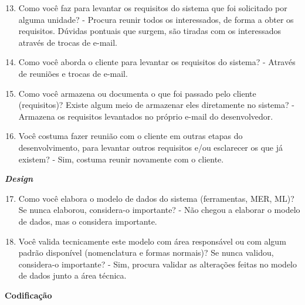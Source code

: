\begin{apendicesenv}
\begin{enumerate}
	\setcounter{enumi}{12}
	\item Como você faz para levantar os requisitos do sistema que foi solicitado por alguma
	unidade?\newline
	- Procura reunir todos os interessados, de forma a obter os requisitos. Dúvidas pontuais que surgem, são tiradas com os interessados através de trocas de e-mail.
	\item Como você aborda o cliente para levantar os requisitos do sistema?\newline
	- Através de reuniões e trocas de e-mail.
	\item Como você armazena ou documenta o que foi passado pelo cliente (requisitos)? Existe
	algum meio de armazenar eles diretamente no sistema?\newline
	- Armazena os requisitos levantados no próprio e-mail do desenvolvedor.
	\item Você costuma fazer reunião com o cliente em outras etapas do desenvolvimento, para
	levantar outros requisitos e/ou esclarecer os que já existem?\newline
	- Sim, costuma reunir novamente com o cliente.
\end{enumerate}

\textbf{\textit{Design}}

\begin{enumerate}
	\setcounter{enumi}{16}
	\item Como você elabora o modelo de dados do sistema (ferramentas, MER, ML)? Se nunca
	elaborou, considera-o importante?\newline
	- Não chegou a elaborar o modelo de dados, mas o considera importante.
	\item Você valida tecnicamente este modelo com área responsável ou com algum padrão
	disponível (nomenclatura e formas normais)? Se nunca validou, considera-o importante?\newline
	- Sim, procura validar as alterações feitas no modelo de dados junto a área técnica.
\end{enumerate}

\textbf{Codificação}


\end{apendicesenv}
